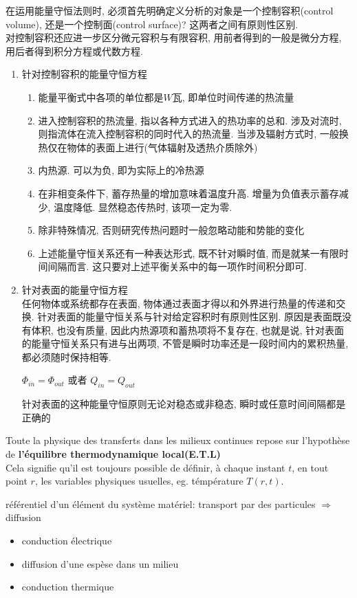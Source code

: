 \documentclass{article}
\begin{document}
在运用能量守恒法则时, 必须首先明确定义分析的对象是一个控制容积(control volume), 还是一个控制面(control surface)? 这两者之间有原则性区别.\\
对控制容积还应进一步区分微元容积与有限容积, 用前者得到的一般是微分方程, 用后者得到积分方程或代数方程.
\begin{enumerate}
\item 针对控制容积的能量守恒方程
	\begin{enumerate}
	\item 能量平衡式中各项的单位都是$W$瓦, 即单位时间传递的热流量
	\item 进入控制容积的热流量, 指以各种方式进入的热功率的总和. 涉及对流时, 则指流体在流入控制容积的同时代入的热流量. 当涉及辐射方式时, 一般换热仅在物体的表面上进行(气体辐射及透热介质除外)
	\item 内热源. 可以为负, 即为实际上的冷热源
	\item 在非相变条件下, 蓄存热量的增加意味着温度升高. 增量为负值表示蓄存减少, 温度降低. 显然稳态传热时, 该项一定为零.
	\item 除非特殊情况, 否则研究传热问题时一般忽略动能和势能的变化
	\item 上述能量守恒关系还有一种表达形式, 既不针对瞬时值, 而是就某一有限时间间隔而言. 这只要对上述平衡关系中的每一项作时间积分即可.
	\end{enumerate}
\item 针对表面的能量守恒方程\\
	任何物体或系统都存在表面, 物体通过表面才得以和外界进行热量的传递和交换. 针对表面的能量守恒关系与针对给定容积时有原则性区别. 原因是表面既没有体积, 也没有质量,
	因此内热源项和蓄热项将不复存在, 也就是说, 针对表面的能量守恒关系只有进与出两项, 不管是瞬时功率还是一段时间内的累积热量, 都必须随时保持相等.
	\begin{center}
	$\Phi_{in} = \Phi_{out}$ 或者 $Q_{in} = Q_{out}$
	\end{center}
	针对表面的这种能量守恒原则无论对稳态或非稳态, 瞬时或任意时间间隔都是正确的
\end{enumerate}

Toute la physique des transferts dans les milieux continues repose sur l'hypoth\`ese de \textbf{l'\'equilibre thermodynamique local(E.T.L)}\\
Cela signifie qu'il est toujours possible de d\'efinir, \`a chaque instant $t$, en tout point $r$, les variables physiques usuelles, eg. t\'emp\'erature $T(r,t)$.

\bigskip
r\'ef\'erentiel d'un \'el\'ement du syst\`eme mat\'eriel: transport par des particules $\Rightarrow$ diffusion
\begin{itemize}
\item conduction \'electrique
\item diffusion d'une esp\`ese dans un milieu
\item conduction thermique
\end{itemize}
\end{document}
